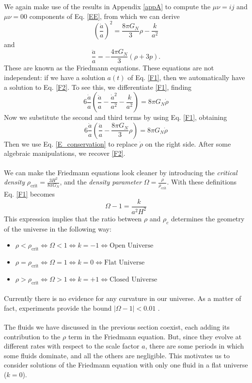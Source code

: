 \documentclass[12pt,letterpaper]{article}         %
\newcommand\para{\paragraph{}}
\begin{document}
We again make use of the results in Appendix \ref{appA}
to compute the $\mu\nu = ij$ and $\mu\nu = 00$ components of Eq. \eqref{EE}, from which we can derive
\begin{equation}
    \left( \frac{\dot{a}}{a} \right)^2 = \frac{8\pi G_N}{3} \rho - \frac{k}{a^2}
    \label{F1}
\end{equation}
and
\begin{equation}
    \frac{\ddot{a}}{a} = -\frac{4\pi G_N}{3} (\rho + 3p).
    \label{F2}
\end{equation}
These are known as the Friedmann equations. These equations are not independent: if we have a solution $a(t)$ of Eq. \eqref{F1}, then we automatically have a solution to Eq. \eqref{F2}. To see this, we differentiate \eqref{F1}, finding 
\[
6 \frac{\dot{a}}{a} \left( \frac{\ddot{a}}{a} - \frac{\dot{a}^2}{a^2} - \frac{k}{a^2} \right) = 8\pi G_N \dot{\rho}
\]
Now we substitute the second and third terms by using Eq. \eqref{F1}, obtaining
\[
    6 \frac{\dot{a}}{a} \left( \frac{\ddot{a}}{a} - \frac{8\pi G_N}{3} \rho \right) = 8\pi G_N \dot{\rho}
\]
Then we use Eq. \eqref{E_conservation} to replace $\dot{\rho}$ on the right side. After some algebraic manipulations, we recover \eqref{F2}.
\para
We can make the Friedmann equations look cleaner by introducing the \emph{critical density} $\rho_\text{crit} = \frac{3 H^2}{8\pi G_N}$, and the \emph{density parameter} $\Omega = \frac{\rho}{\rho_\text{crit}}$. With these definitions Eq. \eqref{F1} becomes
\begin{equation}
     \Omega - 1 =  \frac{k}{a^2H^2}
     \label{FOmega}
\end{equation}
This expression implies that the ratio between $\rho$ and $\rho_c$ determines the geometry of the universe in the following way:
\begin{itemize}
    \item $\rho < \rho_{\text{crit}} \iff \Omega < 1 \iff k = -1 \iff \text{Open Universe}$
    \item $\rho = \rho_{\text{crit}} \iff \Omega = 1 \iff k = 0 \iff \text{Flat Universe}$
    \item $\rho > \rho_{\text{crit}} \iff \Omega > 1 \iff k = +1 \iff \text{Closed Universe}$
\end{itemize}
\para
Currently there is no evidence for any curvature in our universe. As a matter of fact, experiments
provide the bound $|\Omega-1| < 0.01$ \cite{planck2018}.
\para
The fluids we have discussed in the previous section coexist, each adding its contribution to the $\rho$ term in the Friedmann equation. But, since they evolve at different rates with respect to the scale factor $a$, there are some periods in which some fluids dominate, and all the others are negligible. This motivates us to consider solutions of the Friedmann equation with only one fluid in a flat universe ($k=0$).
\end{document}
